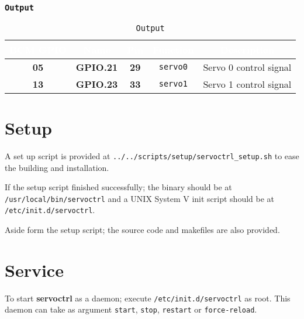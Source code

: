    \subsubsection{\texttt{Output}}
   \begin{table}[!htb]
      \begin{center}
         \begin{tabular}{|c|c|c|c|c|}
            \rowcolor{black}
            \textcolor{white}{\textbf{BCM GPIO}}  &
				\textcolor{white}{\textbf{Name}}  &
            \textcolor{white}{\textbf{Pin}} &
            \textcolor{white}{\textbf{Function}} &
            \textcolor{white}{\textbf{Description}}\\
            \hline
            \hline
            \textbf{05} & \textbf{GPIO.21} & \textbf{29} &
					\texttt{servo0} & Servo 0 control signal \\
            \hline
            \textbf{13} & \textbf{GPIO.23} & \textbf{33} &
					\texttt{servo1} & Servo 1 control signal \\
            \hline
         \end{tabular}
         \caption{\texttt{Output}}
         \label{table:output}
      \end{center}
   \end{table}


\section{Setup}
A set up script is provided at \texttt{../../scripts/setup/servoctrl\_setup.sh}
to ease the building and installation.

If the setup script finished successfully; the binary should be at\\
\texttt{/usr/local/bin/servoctrl} and a UNIX System V init script should be at\\
\texttt{/etc/init.d/servoctrl}.

Aside form the setup script; the source code and makefiles are also provided.

\section{Service}
To start \textbf{servoctrl} as a daemon; execute \texttt{/etc/init.d/servoctrl}
as root. This daemon can take as argument \texttt{start}, \texttt{stop},
\texttt{restart} or \texttt{force-reload}.


